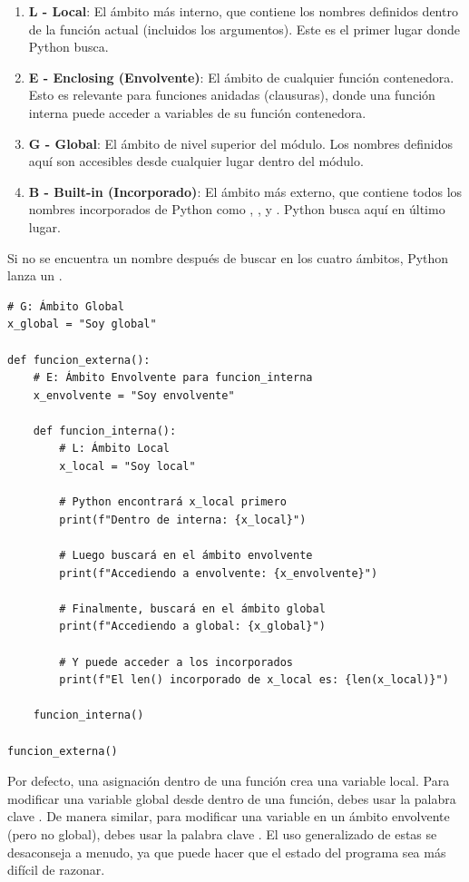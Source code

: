 \begin{enumerate}
    \item \textbf{L - Local}: El ámbito más interno, que contiene los nombres definidos dentro de la función actual (incluidos los argumentos). Este es el primer lugar donde Python busca.
    \item \textbf{E - Enclosing (Envolvente)}: El ámbito de cualquier función contenedora. Esto es relevante para funciones anidadas (clausuras), donde una función interna puede acceder a variables de su función contenedora.
    \item \textbf{G - Global}: El ámbito de nivel superior del módulo. Los nombres definidos aquí son accesibles desde cualquier lugar dentro del módulo.
    \item \textbf{B - Built-in (Incorporado)}: El ámbito más externo, que contiene todos los nombres incorporados de Python como , ,  y . Python busca aquí en último lugar.
\end{enumerate}
Si no se encuentra un nombre después de buscar en los cuatro ámbitos, Python lanza un .

\begin{example}
\text{ }\begin{verbatim}
# G: Ámbito Global
x_global = "Soy global"

def funcion_externa():
    # E: Ámbito Envolvente para funcion_interna
    x_envolvente = "Soy envolvente"
    
    def funcion_interna():
        # L: Ámbito Local
        x_local = "Soy local"
        
        # Python encontrará x_local primero
        print(f"Dentro de interna: {x_local}")
        
        # Luego buscará en el ámbito envolvente
        print(f"Accediendo a envolvente: {x_envolvente}")
        
        # Finalmente, buscará en el ámbito global
        print(f"Accediendo a global: {x_global}")
        
        # Y puede acceder a los incorporados
        print(f"El len() incorporado de x_local es: {len(x_local)}")
        
    funcion_interna()

funcion_externa()
\end{verbatim}
\end{example}
\begin{remark}
Por defecto, una asignación dentro de una función crea una variable local. Para modificar una variable global desde dentro de una función, debes usar la palabra clave . De manera similar, para modificar una variable en un ámbito envolvente (pero no global), debes usar la palabra clave . El uso generalizado de estas se desaconseja a menudo, ya que puede hacer que el estado del programa sea más difícil de razonar.
\end{remark}

